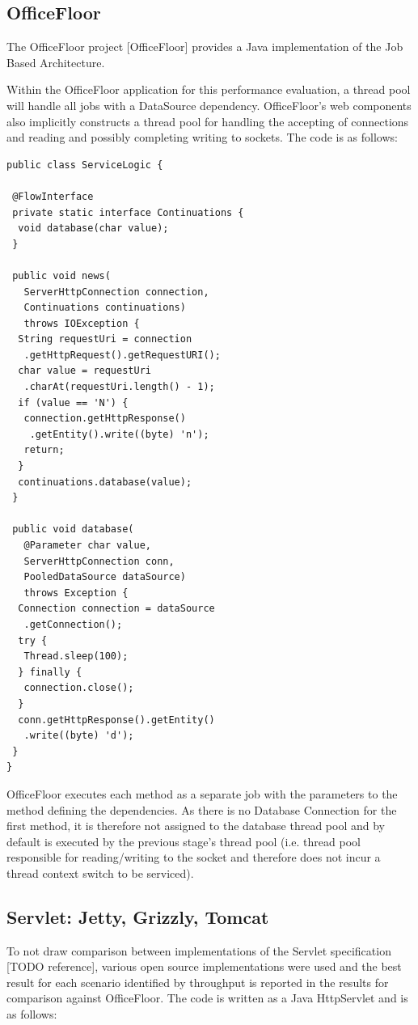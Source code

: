 \documentclass[conference]{ieee/IEEEtran}
\begin{document}
\subsection{OfficeFloor}
The OfficeFloor project [OfficeFloor] provides a Java implementation of the Job
Based Architecture.

Within the OfficeFloor application for this performance evaluation, a thread
pool will handle all jobs with a DataSource dependency.  OfficeFloor's web
components also implicitly constructs a thread pool for handling the accepting
of connections and reading and possibly completing writing to sockets.  The
code is as follows:

\begin{verbatim}
public class ServiceLogic {

 @FlowInterface
 private static interface Continuations {
  void database(char value);
 }

 public void news(
   ServerHttpConnection connection, 
   Continuations continuations) 
   throws IOException { 
  String requestUri = connection
   .getHttpRequest().getRequestURI(); 
  char value = requestUri
   .charAt(requestUri.length() - 1); 
  if (value == 'N') {
   connection.getHttpResponse()
    .getEntity().write((byte) 'n');
   return;
  }
  continuations.database(value);
 }

 public void database(
   @Parameter char value, 
   ServerHttpConnection conn,
   PooledDataSource dataSource) 
   throws Exception {
  Connection connection = dataSource
   .getConnection();
  try {
   Thread.sleep(100);
  } finally {
   connection.close();
  }
  conn.getHttpResponse().getEntity()
   .write((byte) 'd');
 }
}
\end{verbatim}
   
OfficeFloor executes each method as a separate job with the parameters to the
method defining the dependencies.  As there is no Database Connection for the
first method, it is therefore not assigned to the database thread pool and by
default is executed by the previous stage's thread pool (i.e. thread pool
responsible for reading/writing to the socket and therefore does not incur a
thread context switch to be serviced).


\subsection{Servlet: Jetty, Grizzly, Tomcat}
To not draw comparison between implementations of the Servlet specification
[TODO reference], various open source implementations were used and the best
result for each scenario identified by throughput is reported in the results
for comparison against OfficeFloor.  The code is written as a Java HttpServlet
and is as follows:
\end{document}
